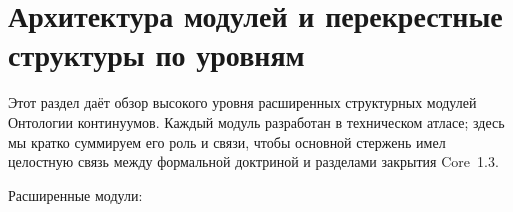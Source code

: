 
\section{Архитектура модулей и перекрестные структуры по уровням}
\label{sec:modules_master}

Этот раздел даёт обзор высокого уровня расширенных структурных модулей
Онтологии континуумов. Каждый модуль разработан в техническом атласе;
здесь мы кратко суммируем его роль и связи, чтобы основной стержень имел
целостную связь между формальной доктриной и разделами закрытия Core~1.3.

Расширенные модули:

